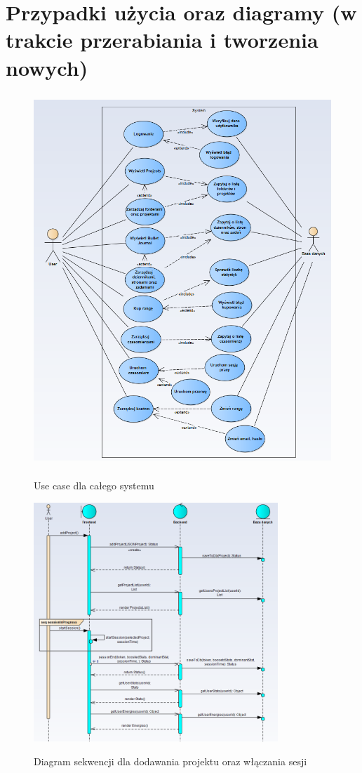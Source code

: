 \documentclass[a4paper,11pt]{report}
\begin{document}
\section{Przypadki użycia oraz diagramy (w trakcie przerabiania i tworzenia nowych)}
\begin{figure}[h]
	\centering
	\includegraphics[width=\textwidth, height=14cm]{systemusecase.png}\\
	\caption{Use case dla całego systemu}
	\label{fig:usecase}
\end{figure}
\begin{figure}[h]
	\centering
	\includegraphics[width=\textwidth, height=9cm]{sekwencji.png}\\
	\caption{Diagram sekwencji dla dodawania projektu oraz włączania sesji}
	\label{fig:seq1}
\end{figure}
\end{document}
